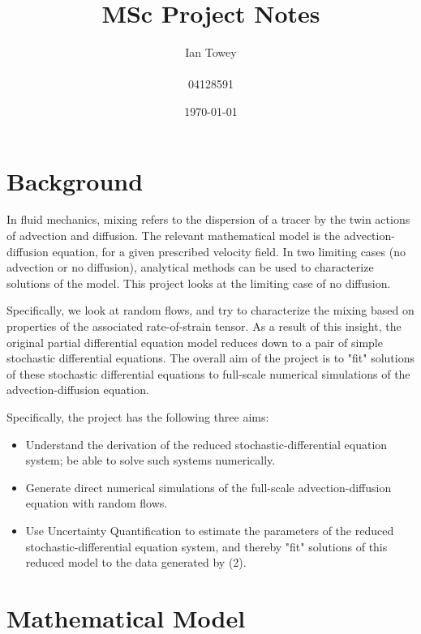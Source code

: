 \documentclass[a4paper]{article}
\title{MSc Project Notes}
\author{Ian Towey \\ \\ 04128591}
\date{\today}
\begin{document}
  \maketitle

\tableofcontents

\newpage
\section{Background}

In fluid mechanics, mixing refers to the dispersion of a tracer by the twin actions of advection and diffusion. The relevant mathematical model is the advection-diffusion equation, for a given prescribed velocity field. In two limiting cases (no advection or no diffusion), analytical methods can be used to characterize solutions of the model. This project looks at the limiting case of no diffusion.
\par
\vspace{5mm}
Specifically, we look at random flows, and try to characterize the mixing based on properties of the associated rate-of-strain tensor.  As a result of this insight, the original partial differential equation model reduces down to a pair of simple stochastic differential equations.  The overall aim of the project is to "fit" solutions of these stochastic differential equations to full-scale numerical simulations of the advection-diffusion equation.
\par
\vspace{5mm}
Specifically, the project has the following three aims:

\begin{itemize}
  \item Understand the derivation of the reduced stochastic-differential equation system; be able to solve such systems numerically.
  \item Generate direct numerical simulations of the full-scale advection-diffusion equation with random flows.
  \item Use Uncertainty Quantification to estimate the parameters of the reduced stochastic-differential equation system, and thereby "fit" solutions of this reduced model to the data generated by (2).
\end{itemize}

\newpage
\section{Mathematical Model}
\end{document}
